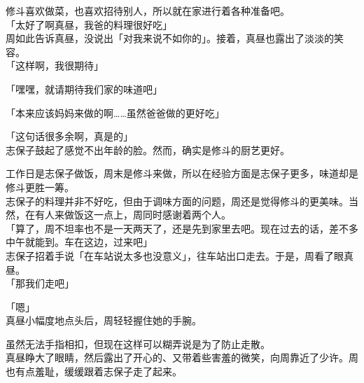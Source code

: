 修斗喜欢做菜，也喜欢招待别人，所以就在家进行着各种准备吧。\\

「太好了啊真昼，我爸的料理很好吃」\\

周如此告诉真昼，没说出「对我来说不如你的」。接着，真昼也露出了淡淡的笑容。\\

「这样啊，我很期待」

「嘿嘿，就请期待我们家的味道吧」

「本来应该妈妈来做的啊……虽然爸爸做的更好吃」

「这句话很多余啊，真是的」\\

志保子鼓起了感觉不出年龄的脸。然而，确实是修斗的厨艺更好。

工作日是志保子做饭，周末是修斗来做，所以在经验方面是志保子更多，味道却是修斗更胜一筹。\\

志保子的料理并非不好吃，但由于调味方面的问题，周还是觉得修斗的更美味。当然，在有人来做饭这一点上，周同时感谢着两个人。\\

「算了，周不坦率也不是一天两天了，还是先到家里去吧。现在过去的话，差不多中午就能到。车在这边，过来吧」\\

志保子招着手说「在车站说太多也没意义」，往车站出口走去。于是，周看了眼真昼。\\

「那我们走吧」

「嗯」\\

真昼小幅度地点头后，周轻轻握住她的手腕。

虽然无法手指相扣，但现在这样可以糊弄说是为了防止走散。\\

真昼睁大了眼睛，然后露出了开心的、又带着些害羞的微笑，向周靠近了少许。周也有点羞耻，缓缓跟着志保子走了起来。
